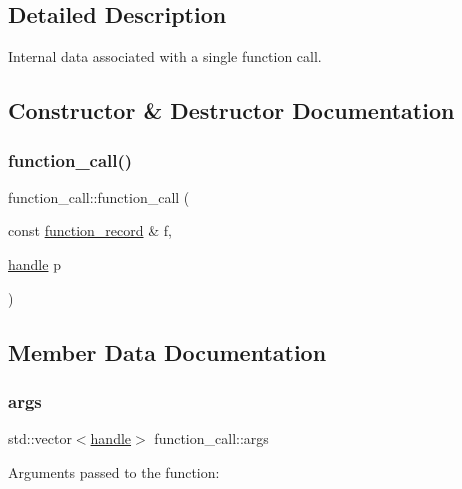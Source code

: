 \subsection{Detailed Description}
Internal data associated with a single function call. 

\subsection{Constructor \& Destructor Documentation}
\mbox{\label{structfunction__call_a7e92652f2171a83f7d690f57983c1631}} 
\subsubsection{\texorpdfstring{function\_call()}{function\_call()}}
{\footnotesize\ttfamily function\+\_\+call\+::function\+\_\+call (\begin{DoxyParamCaption}\item[{const \mbox{\hyperlink{structfunction__record}{function\+\_\+record}} \&}]{f,  }\item[{\mbox{\hyperlink{classhandle}{handle}}}]{p }\end{DoxyParamCaption})\hspace{0.3cm}{\ttfamily [inline]}}



\subsection{Member Data Documentation}
\mbox{\label{structfunction__call_ae77a8a65a8ae5ebbbd2eb17bc9ff54d3}} 
\subsubsection{\texorpdfstring{args}{args}}
{\footnotesize\ttfamily std\+::vector$<$\mbox{\hyperlink{classhandle}{handle}}$>$ function\+\_\+call\+::args}



Arguments passed to the function\+: 

\mbox{\label{structfunction__call_aef756a1f9206af0d2e3fdb684b2d6b5f}} 
